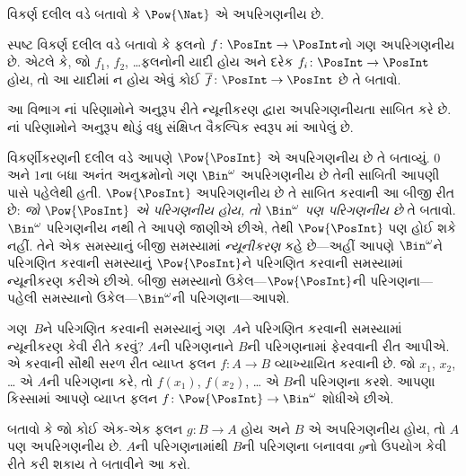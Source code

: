\begin{prob}
વિકર્ણ દલીલ વડે બતાવો કે $\Pow{\Nat}$ એ અપરિગણનીય છે.
\end{prob}

\begin{prob}\label{sfr:siz:nen:prob:f-posint}
સ્પષ્ટ વિકર્ણ દલીલ વડે બતાવો કે ફલનો
$f \colon \PosInt \to \PosInt$નો ગણ અપરિગણનીય છે.
એટલે કે, જો $f_1$, $f_2$, \dots ફલનોની યાદી હોય અને દરેક
$f_i\colon \PosInt \to \PosInt$ હોય, તો આ યાદીમાં ન હોય એવું
કોઈ $\overline{f}\colon \PosInt \to \PosInt$ છે તે બતાવો.
\end{prob}
\endgroup


\begingroup
\makeatletter{}\makeatother


\label{guunit:OLP-0034}


\begin{editorial}
  આ વિભાગ નાં પરિણામોને અનુરૂપ રીતે
  ન્યૂનીકરણ દ્વારા અપરિગણનીયતા સાબિત કરે છે. નાં
  પરિણામોને અનુરૂપ થોડું વધુ સંક્ષિપ્ત વૈકલ્પિક સ્વરૂપ
  માં આપેલું છે.
\end{editorial}

વિકર્ણીકરણની દલીલ વડે આપણે $\Pow{\PosInt}$ એ અપરિગણનીય
છે તે બતાવ્યું. $0$ અને $1$ના બધા અનંત અનુક્રમોનો ગણ
$\Bin^\omega$ અપરિગણનીય છે તેની સાબિતી આપણી પાસે
પહેલેથી હતી. $\Pow{\PosInt}$ અપરિગણનીય છે તે સાબિત કરવાની
આ બીજી રીત છે: \emph{જો $\Pow{\PosInt}$ એ પરિગણનીય હોય, તો
$\Bin^\omega$ પણ પરિગણનીય છે} તે બતાવો. $\Bin^\omega$
પરિગણનીય નથી તે આપણે જાણીએ છીએ, તેથી $\Pow{\PosInt}$ પણ
હોઈ શકે નહીં. તેને એક સમસ્યાનું બીજી સમસ્યામાં \emph{ન્યૂનીકરણ}
કહે છે---અહીં આપણે $\Bin^\omega$ને પરિગણિત કરવાની સમસ્યાનું
$\Pow{\PosInt}$ને પરિગણિત કરવાની સમસ્યામાં ન્યૂનીકરણ કરીએ છીએ.
બીજી સમસ્યાનો ઉકેલ---$\Pow{\PosInt}$ની પરિગણના---પહેલી સમસ્યાનો
ઉકેલ---$\Bin^\omega$ની પરિગણના---આપશે.

ગણ~$B$ને પરિગણિત કરવાની સમસ્યાનું ગણ~$A$ને પરિગણિત કરવાની
સમસ્યામાં ન્યૂનીકરણ કેવી રીતે કરવું? $A$ની પરિગણનાને $B$ની
પરિગણનામાં ફેરવવાની રીત આપીએ. એ કરવાની સૌથી સરળ રીત
વ્યાપ્ત ફલન $f\colon A \to B$ વ્યાખ્યાયિત કરવાની છે.
જો $x_1$, $x_2$, \dots{} એ $A$ની પરિગણના કરે, તો
$f(x_1)$, $f(x_2)$, \dots{} એ $B$ની પરિગણના કરશે.
આપણા કિસ્સામાં આપણે વ્યાપ્ત ફલન
$f\colon \Pow{\PosInt} \to \Bin^\omega$ શોધીએ છીએ.

\begin{prob}
બતાવો કે જો કોઈ એક-એક ફલન $g\colon B \to A$ હોય અને
$B$ એ અપરિગણનીય હોય, તો $A$ પણ અપરિગણનીય છે.
$A$ની પરિગણનામાંથી $B$ની પરિગણના બનાવવા $g$નો ઉપયોગ કેવી રીતે
કરી શકાય તે બતાવીને આ કરો.
\end{prob}

